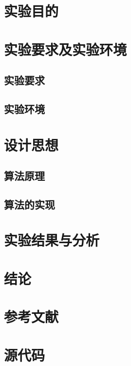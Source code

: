 \documentclass{ML}
\begin{document}
\maketitle

\tableofcontents
\newpage

\section{实验目的}

\section{实验要求及实验环境}

\subsection{实验要求}

\subsection{实验环境}


\section{设计思想}

\subsection{算法原理}

\subsection{算法的实现}

\section{实验结果与分析}


\section{结论}


\section{参考文献}

\appendix

\section{源代码}
\end{document}
